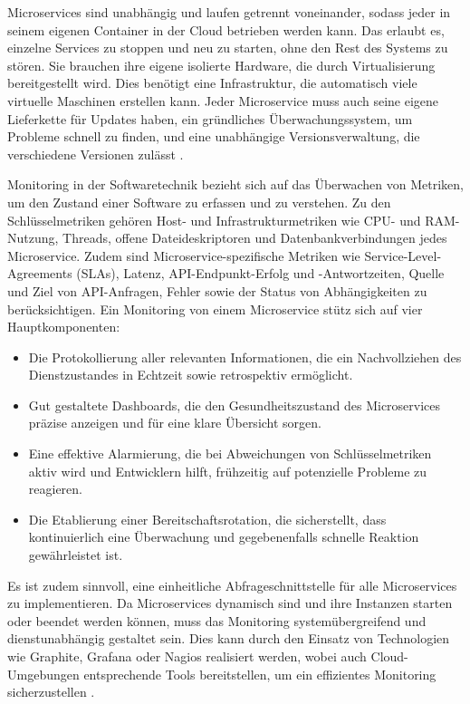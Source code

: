 {Microservices sind unabhängig und laufen getrennt voneinander, sodass jeder in seinem eigenen Container in der Cloud betrieben werden kann. Das erlaubt es, einzelne Services zu stoppen und neu zu starten, ohne den Rest des Systems zu stören. Sie brauchen ihre eigene isolierte Hardware, die durch Virtualisierung bereitgestellt wird. Dies benötigt eine Infrastruktur, die automatisch viele virtuelle Maschinen erstellen kann. Jeder Microservice muss auch seine eigene Lieferkette für Updates haben, ein gründliches Überwachungssystem, um Probleme schnell zu finden, und eine unabhängige Versionsverwaltung, die verschiedene Versionen zulässt \cite[S.158]{sommerville} \cite[S. 80-81]{wolff}.

Monitoring in der Softwaretechnik bezieht sich auf das Überwachen von Metriken, um den Zustand einer Software zu erfassen und zu verstehen. Zu den Schlüsselmetriken gehören Host- und Infrastrukturmetriken wie CPU- und RAM-Nutzung, Threads, offene Dateideskriptoren und Datenbankverbindungen jedes Microservice. Zudem sind Microservice-spezifische Metriken wie Service-Level-Agreements (SLAs), Latenz, API-Endpunkt-Erfolg und -Antwortzeiten, Quelle und Ziel von API-Anfragen, Fehler sowie der Status von Abhängigkeiten zu berücksichtigen. Ein Monitoring von einem Microservice stütz sich auf vier Hauptkomponenten:

\begin{itemize}
\item Die Protokollierung aller relevanten Informationen, die ein Nachvollziehen des Dienstzustandes in Echtzeit sowie retrospektiv ermöglicht.
\item Gut gestaltete Dashboards, die den Gesundheitszustand des Microservices präzise anzeigen und für eine klare Übersicht sorgen.
\item Eine effektive Alarmierung, die bei Abweichungen von Schlüsselmetriken aktiv wird und Entwicklern hilft, frühzeitig auf potenzielle Probleme zu reagieren.
\item Die Etablierung einer Bereitschaftsrotation, die sicherstellt, dass kontinuierlich eine Überwachung und gegebenenfalls schnelle Reaktion gewährleistet ist.
\end{itemize}

Es ist zudem sinnvoll, eine einheitliche Abfrageschnittstelle für alle Microservices zu implementieren. Da Microservices dynamisch sind und ihre Instanzen starten oder beendet werden können, muss das Monitoring systemübergreifend und dienstunabhängig gestaltet sein. Dies kann durch den Einsatz von Technologien wie Graphite, Grafana oder Nagios realisiert werden, wobei auch Cloud-Umgebungen entsprechende Tools bereitstellen, um ein effizientes Monitoring sicherzustellen \cite[S. 250 - 256]{wolff} \cite[S.105-108]{fowlersusan}.

}
